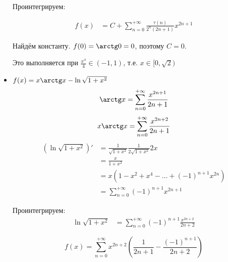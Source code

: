\begin{exercise}[2873]
\begin{itemize}
              Проинтегрируем:

              \begin{align}
                  f(x) & = C + \sum_{n = 0}^{+\infty} \frac{\tau(n)}{2^n(2n + 1)} x^{2n + 1}
              \end{align}

              Найдём константу. \(f(0) = \arctg 0 = 0\), поэтому \(C = 0\).

              Это выполняется при \(\frac{x^4}{4}\in( - 1, 1)\), т.е. \(x\in [0,\sqrt{2})\)
        \item [(д)] \(f(x) = x \arctg x - \ln\sqrt{1 + x^2}\)
              \[\arctg x = \sum_{n = 0}^{+\infty} \frac{x^{2n + 1}}{2n + 1}\]
              \[x\arctg x = \sum_{n = 0}^{+\infty} \frac{x^{2n + 2}}{2n + 1}\]
              \begin{align*}
                  \left(\ln\sqrt{1 + x^2}\right)' & = \frac{1}{\sqrt{1 + x^2}} \frac{1}{2\sqrt{1 + x^2}} 2x         \\
                                                  & = \frac{x}{1 + x^2}                                             \\
                                                  & = x\left( 1 - x^2 + x^4 - \dots + ( - 1)^{n + 1} x^{2n} \right) \\
                                                  & = \sum_{n = 0}^{+\infty} ( - 1)^{n + 1} x^{2n + 1}
              \end{align*}

              Проинтегрируем:
              \begin{align*}
                  \ln\sqrt{1 + x^2} & = \sum_{n = 0}^{+\infty} ( - 1)^{n + 1} \frac{x^{2n + 2}}{2n + 2}
              \end{align*}

              \[f(x) = \sum_{n = 0}^{+\infty} x^{2n + 2} \left( \frac{1}{2n + 1} - \frac{( - 1)^{n + 1}}{2n + 2} \right)\]


\end{itemize}
\end{exercise}
